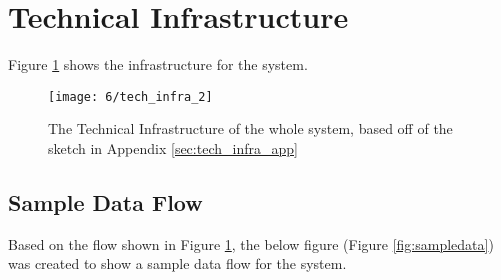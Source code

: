 \documentclass[../dissertation.tex]{subfiles}
\begin{document}
\section{Technical Infrastructure}

Figure \ref{fig:techinfra} shows the infrastructure for the system.

\begin{figure}
    \centering
    \texttt{[image: 6/tech\_infra\_2]}
    \caption{The Technical Infrastructure of the whole system, based off of the sketch in Appendix \ref{sec:tech_infra_app}}
    \label{fig:techinfra}
\end{figure}

\subsection{Sample Data Flow}

Based on the flow shown in Figure \ref{fig:techinfra}, the below figure (Figure \ref{fig:sampledata}) was created to show a sample data flow for the system.
\end{document}
